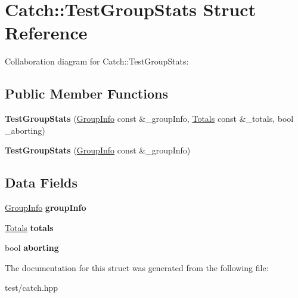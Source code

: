 \hypertarget{structCatch_1_1TestGroupStats}{}\section{Catch\+:\+:Test\+Group\+Stats Struct Reference}
\label{structCatch_1_1TestGroupStats}


Collaboration diagram for Catch\+:\+:Test\+Group\+Stats\+:
\subsection*{Public Member Functions}
\begin{DoxyCompactItemize}
\item 
{\bfseries Test\+Group\+Stats} (\hyperlink{structCatch_1_1GroupInfo}{Group\+Info} const \&\+\_\+group\+Info, \hyperlink{structCatch_1_1Totals}{Totals} const \&\+\_\+totals, bool \+\_\+aborting)\hypertarget{structCatch_1_1TestGroupStats_aa3b01aa722be787059bca806e4f10be4}{}\label{structCatch_1_1TestGroupStats_aa3b01aa722be787059bca806e4f10be4}

\item 
{\bfseries Test\+Group\+Stats} (\hyperlink{structCatch_1_1GroupInfo}{Group\+Info} const \&\+\_\+group\+Info)\hypertarget{structCatch_1_1TestGroupStats_a2b2bb846beeb23d4dd20b1f5cd7e92bb}{}\label{structCatch_1_1TestGroupStats_a2b2bb846beeb23d4dd20b1f5cd7e92bb}

\end{DoxyCompactItemize}
\subsection*{Data Fields}
\begin{DoxyCompactItemize}
\item 
\hyperlink{structCatch_1_1GroupInfo}{Group\+Info} {\bfseries group\+Info}\hypertarget{structCatch_1_1TestGroupStats_a61c3692541a33e959ad5a0053cdc001b}{}\label{structCatch_1_1TestGroupStats_a61c3692541a33e959ad5a0053cdc001b}

\item 
\hyperlink{structCatch_1_1Totals}{Totals} {\bfseries totals}\hypertarget{structCatch_1_1TestGroupStats_a625961cf25978cc0736acc3fe6e60928}{}\label{structCatch_1_1TestGroupStats_a625961cf25978cc0736acc3fe6e60928}

\item 
bool {\bfseries aborting}\hypertarget{structCatch_1_1TestGroupStats_a9e172443a3da84c8845a831f102a74db}{}\label{structCatch_1_1TestGroupStats_a9e172443a3da84c8845a831f102a74db}

\end{DoxyCompactItemize}


The documentation for this struct was generated from the following file\+:\begin{DoxyCompactItemize}
\item 
test/catch.\+hpp\end{DoxyCompactItemize}
